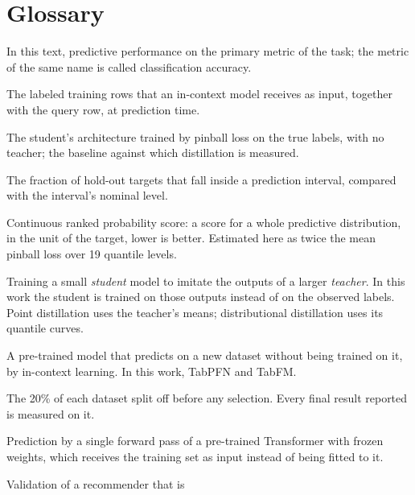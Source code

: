 \chapter*{Glossary}
\begin{description}\itemsep3pt
  \item[Accuracy] In this text, predictive performance on the
    primary metric of the task; the metric of the same name is
    called classification accuracy.
  \item[Context] The labeled training rows that an in-context model
    receives as input, together with the query row, at prediction
    time.
  \item[Control] The student's architecture trained by pinball loss
    on the true labels, with no teacher; the baseline against which
    distillation is measured.
  \item[Coverage] The fraction of hold-out targets that fall inside
    a prediction interval, compared with the interval's nominal
    level.
  \item[CRPS] Continuous ranked probability score: a score for a
    whole predictive distribution, in the unit of the target, lower
    is better. Estimated here as twice the mean pinball loss over 19
    quantile levels.
  \item[Distillation] Training a small \emph{student} model to
    imitate the outputs of a larger \emph{teacher}. In this work the
    student is trained on those outputs instead of on the observed
    labels. Point distillation uses the teacher's means;
    distributional distillation uses its quantile curves.
  \item[Foundation model (tabular)] A pre-trained model that predicts
    on a new dataset without being trained on it, by in-context
    learning. In this work, TabPFN and TabFM.
  \item[Hold-out] The 20\% of each dataset split off before any
    selection. Every final result reported is measured on it.
  \item[In-context learning] Prediction by a single forward pass of a
    pre-trained Transformer with frozen weights, which receives the
    training set as input instead of being fitted to it.
  \item[Leave-one-dataset-out] Validation of a recommender that is

\end{description}
